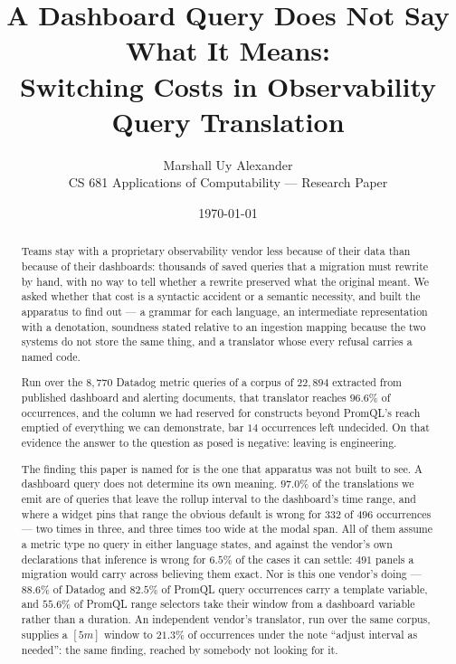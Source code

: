 \title{\textbf{A Dashboard Query Does Not Say What It Means:}\\
\Large Switching Costs in Observability Query Translation}
\author{Marshall Uy Alexander\\ \small CS 681 Applications of Computability --- Research Paper}
\date{\small \today}


\maketitle

\begin{abstract}\noindent
Teams stay with a proprietary observability vendor less because of their data than
because of their dashboards: thousands of saved queries that a migration must rewrite by
hand, with no way to tell whether a rewrite preserved what the original meant. We asked
whether that cost is a syntactic accident or a semantic necessity, and built the
apparatus to find out --- a grammar for each language, an intermediate representation with
a denotation, soundness stated relative to an ingestion mapping because the two systems do
not store the same thing, and a translator whose every refusal carries a named code.

Run over the $8{,}770$ Datadog metric queries of a corpus of $22{,}894$ extracted from
published dashboard and alerting documents, that translator reaches $96.6\%$ of
occurrences, and the column we had reserved for constructs beyond PromQL's reach emptied
of everything we can demonstrate, bar $14$ occurrences left undecided. On that evidence
the answer to the question as posed is negative: leaving is engineering.

The finding this paper is named for is the one that apparatus was not built to see. A
dashboard query does not determine its own meaning. $97.0\%$ of the translations we emit
are of queries that leave the rollup interval to the dashboard's time range, and where a
widget pins that range the obvious default is wrong for $332$ of $496$ occurrences --- two
times in three, and three times too wide at the modal span. All of them assume a metric
type no query in either language states, and against the vendor's own declarations that
inference is wrong for $6.5\%$ of the cases it can settle: $491$ panels a migration would
carry across believing them exact. Nor is this one vendor's doing --- $88.6\%$ of Datadog
and $82.5\%$ of PromQL query occurrences carry a template variable, and $55.6\%$ of PromQL
range selectors take their window from a dashboard variable rather than a duration. An
independent vendor's translator, run over the same corpus, supplies a $[5m]$ window to
$21.3\%$ of occurrences under the note ``adjust interval as needed'': the same finding,
reached by somebody not looking for it.


\end{abstract}

